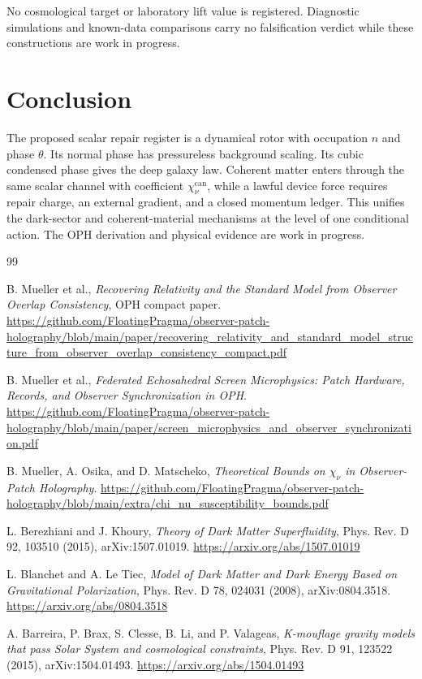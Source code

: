 \documentclass[11pt]{article}
\newcommand{\chican}{\chi_\nu^{\mathrm{can}}}
\begin{document}
No cosmological target or laboratory lift value is registered. Diagnostic
simulations and known-data comparisons carry no falsification verdict while
these constructions are work in progress.

\section{Conclusion}

The proposed scalar repair register is a dynamical rotor with occupation
\(n\) and phase \(\theta\). Its normal phase has pressureless background
scaling. Its cubic condensed phase gives the deep galaxy law. Coherent matter
enters through the same scalar channel with coefficient \(\chican\), while a
lawful device force requires repair charge, an external gradient, and a closed
momentum ledger. This unifies the dark-sector and coherent-material mechanisms
at the level of one conditional action. The OPH derivation and physical
evidence are work in progress.

\begin{thebibliography}{99}

B. Mueller et al.,
\emph{Recovering Relativity and the Standard Model from Observer Overlap Consistency},
OPH compact paper.
\url{https://github.com/FloatingPragma/observer-patch-holography/blob/main/paper/recovering_relativity_and_standard_model_structure_from_observer_overlap_consistency_compact.pdf}

B. Mueller et al.,
\emph{Federated Echosahedral Screen Microphysics: Patch Hardware, Records, and Observer Synchronization in OPH}.
\url{https://github.com/FloatingPragma/observer-patch-holography/blob/main/paper/screen_microphysics_and_observer_synchronization.pdf}

B. Mueller, A. Osika, and D. Matscheko,
\emph{Theoretical Bounds on \(\chi_\nu\) in Observer-Patch Holography}.
\url{https://github.com/FloatingPragma/observer-patch-holography/blob/main/extra/chi_nu_susceptibility_bounds.pdf}

L. Berezhiani and J. Khoury,
\emph{Theory of Dark Matter Superfluidity},
Phys. Rev. D 92, 103510 (2015), arXiv:1507.01019.
\url{https://arxiv.org/abs/1507.01019}

L. Blanchet and A. Le Tiec,
\emph{Model of Dark Matter and Dark Energy Based on Gravitational Polarization},
Phys. Rev. D 78, 024031 (2008), arXiv:0804.3518.
\url{https://arxiv.org/abs/0804.3518}

A. Barreira, P. Brax, S. Clesse, B. Li, and P. Valageas,
\emph{K-mouflage gravity models that pass Solar System and cosmological constraints},
Phys. Rev. D 91, 123522 (2015), arXiv:1504.01493.
\url{https://arxiv.org/abs/1504.01493}

\end{thebibliography}
\end{document}
